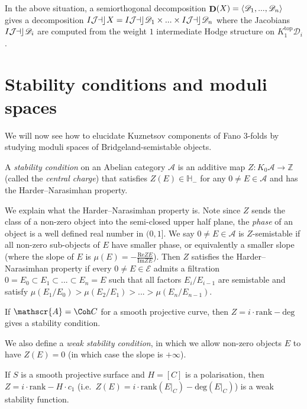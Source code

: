\begin{corollary}
    In the above situation, a semiorthogonal decomposition \(\mathop{\mathbf{D}}(X)=\langle
    \mathscr{D}_1,...,\mathscr{D}_n \rangle\) gives a decomposition
    \(\mathop{I\mathcal{J\kern -0.5pt a\kern -0.5pt c\kern -1pt}} X=\mathop{I\mathcal{J\kern -0.5pt a\kern -0.5pt c\kern -1pt}} \mathscr{D}_1\times ... \times
    \mathop{I\mathcal{J\kern -0.5pt a\kern -0.5pt c\kern -1pt}} \mathscr{D}_n\) where the Jacobians \(\mathop{I\mathcal{J\kern -0.5pt a\kern -0.5pt c\kern -1pt}} \mathscr{D}_i\)
    are computed from the weight \(1\) intermediate Hodge structure on
    \(K_1^\text{top}\mathscr{D}_i\).
\end{corollary}

\section{Stability conditions and moduli spaces}
We will now see how to elucidate Kuznetsov components of Fano 3-folds by
studying moduli spaces of Bridgeland-semistable objects.

\begin{definition}
    A \textit{stability condition} on an Abelian category \(\mathscr{A}\) is an
    additive map \(Z:K_0\mathscr{A} \to \mathbb{Z}\) (called the \textit{central
    charge}) that satisfies \(Z(E)\in \mathbb{H}_-\) for any \(0\neq E\in
    \mathscr{A}\) and has the Harder--Narasimhan property.
\end{definition}

We explain what the Harder--Narasimhan property is. Note since \(Z\) sends the
class of a non-zero object into the semi-closed upper half plane, the
\textit{phase} of an object is a well defined real number in \((0,1]\). We say
\(0\neq E\in \mathscr{A}\) is \(Z\)-semistable if all non-zero sub-objects of
\(E\) have smaller phase, or equivalently a smaller slope (where the slope of
\(E\) is \(\mu(E)=-\frac{\text{Re}ZE}{\text{Im}ZE}\)). Then \(Z\) satisfies the
Harder--Narasimhan property if every \(0\neq E\in \mathscr{E}\) admits a
filtration \(0=E_0\subset E_1\subset ... \subset E_n = E\) such that all factors
\(E_i/E_{i-1}\) are semistable and satisfy
\(\mu(E_1/E_0)>\mu(E_2/E_1)>...>\mu(E_n/E_{n-1})\).

\begin{example}
    If \(\mathscr{A}=\Coh C\) for a smooth projective curve, then
    \(Z=i\cdot \text{rank}-\text{deg}\) gives a stability condition.
\end{example}

We also define a \textit{weak stability condition}, in which we allow non-zero
objects \(E\) to have \(Z(E)=0\) (in which case the slope is \(+\infty\)).

\begin{example}
    If \(S\) is a smooth projective surface and \(H=[C]\) is a polarisation,
    then \(Z=i\cdot \text{rank}-H\cdot c_1\) (i.e.\ \(Z(E)= i\cdot
    \text{rank}(E|_C)-\text{deg}(E|_C)\)) is a weak stability function.
\end{example}

